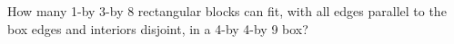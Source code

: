 How many 1-by 3-by 8 rectangular blocks can fit, with all edges parallel to the box edges and interiors disjoint, in a 4-by 4-by 9 box?

